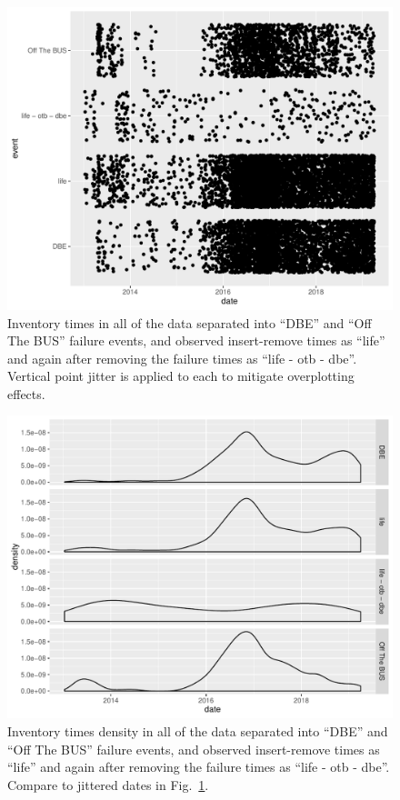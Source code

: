 \begin{figure}[bth]
  \centering
  \includegraphics[width=\textwidth]{inventory_times.pdf}
  \caption{Inventory times in all of the data separated into ``DBE''
    and ``Off The BUS'' failure events, and observed insert-remove
    times as ``life'' and again after removing the failure times as
    ``life - otb - dbe''. Vertical point jitter is applied to each to
    mitigate overplotting effects.}
  \label{fig:inventory_dates}
\end{figure}
\begin{figure}[bth]
  \centering
  \includegraphics[width=\textwidth]{inventory_density.pdf}
  \caption{Inventory times density in all of the data separated into
    ``DBE'' and ``Off The BUS'' failure events, and observed
    insert-remove times as ``life'' and again after removing the
    failure times as ``life - otb - dbe''. Compare to jittered dates
    in Fig.~\ref{fig:inventory_dates}.}
  \label{fig:inventory_density}
\end{figure}
